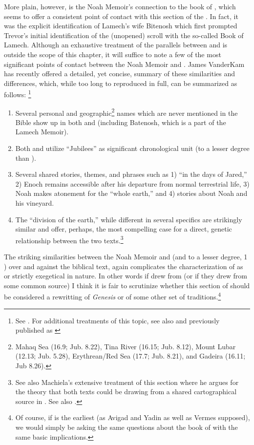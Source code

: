 More plain, however, is the Noah Memoir's connection to the book of \jub, which seems to offer a consistent point of contact with this section of the \ga.\autocite[20]{fitzmyer2004} In fact, it was the explicit identification of Lamech's wife Bitenosh which first prompted Trevor's initial identification of the (unopened) scroll with the so-called Book of Lamech.\autocite{trevor_basor1949} Although an exhaustive treatment of the parallels between \jub and \ga is outside the scope of this chapter, it will suffice to note a few of the most significant points of contact between the Noah Memoir and \jub. James VanderKam has recently offered a detailed, yet concise, summary of these similarities and differences, which, while too long to reproduced in full, can be summarized as follows:%
\footnote{See \cite[374--376]{vanderkam_feldman-etal2017}. For additional treatments of this topic, see also \cite{machiela2009} and \cite[305--342]{kugel2012} previously published as \cite{kugel_roitman-etal2011}} 

\begin{enumerate}
    \item Several personal and geographic\footnote{%
        Mahaq Sea (16.9; Jub. 8.22), Tina River (16.15; Jub. 8.12), Mount Lubar (12.13; Jub. 5.28), Erythrean/Red Sea (17.7; Jub. 8.21), and Gadeira (16.11; Jub 8.26).}%
        names which are never mentioned in the Bible show up in both \ga and \jub (including Batenosh, which is a part of the Lamech Memoir).
    \item Both \jub and \ga utilize ``Jubilees'' as significant chronological unit (\ga to a lesser degree than \jub).
    \item Several shared stories, themes, and phrases such as 1) ``in the days of Jared,'' 2) Enoch remains accessible after his departure from normal terrestrial life, 3) Noah makes atonement for the ``whole earth,'' and 4) stories about Noah and his vineyard.
    \item The ``division of the earth,'' while different in several specifics are strikingly similar and offer, perhaps, the most compelling case for a direct, genetic relationship between the two texts.\footnote{See also Machiela's extensive treatment of this section where he argues for the theory that both texts could be drawing from a shared cartographical source in \cite*[105--130]{machiela2009}. See also \cite{alexander_jjs1982}.}
\end{enumerate}

The striking similarities between the Noah Memoir and \jub  (and to a lesser degree, 1 \enoch) over and against the biblical text, again complicates the characterization of \ga as \rwb or strictly exegetical in nature. In other words if \ga drew from \jub (or if they drew from some common source) I think it is fair to scrutinize whether this section of \ga should be considered a rewritting of \emph{Genesis} or of some other set of traditions.\footnote{Of course, if \ga is the earliest (as Avigad and Yadin as well as Vermes supposed), we would simply be asking the same questions about the book of \jub with the same basic implications.}

